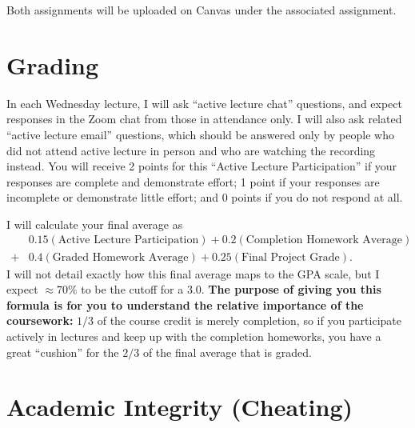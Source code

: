 \documentclass[12pt]{article}
\begin{document}
Both assignments will be uploaded on Canvas under the associated assignment.

\section*{Grading}

In each Wednesday lecture, I will ask ``active lecture chat'' questions, and expect responses in the Zoom chat from those in attendance only. I will also ask related ``active lecture email'' questions, which should be answered only by people who did not attend active lecture in person and who are watching the recording instead. You will receive 2 points for this ``Active Lecture Participation'' if your responses are complete and demonstrate effort; 1 point if your responses are incomplete or demonstrate little effort; and 0 points if you do not respond at all.

I will calculate your final average as 
\begin{align*}
&0.15 (\text{Active Lecture Participation}) + 0.2 (\text{Completion Homework Average}) \\ + &0.4 (\text{Graded Homework Average}) + 0.25 (\text{Final Project Grade}).
\end{align*}
I will not detail exactly how this final average maps to the GPA scale, but I expect $\approx 70\%$ to be the cutoff for a 3.0. \textbf{The purpose of giving you this formula is for you to understand the relative importance of the coursework:} $1/3$ of the course credit is merely completion, so if you participate actively in lectures and keep up with the completion homeworks, you have a great ``cushion'' for the $2/3$ of the final average that is graded.

\section*{Academic Integrity (Cheating)}
\end{document}
